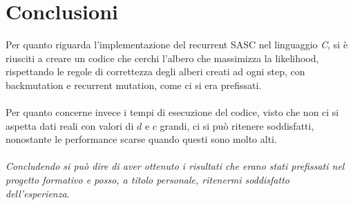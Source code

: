 \documentclass[12pt]{report}
\begin{document}
\chapter{Conclusioni}

Per quanto riguarda l'implementazione del recurrent SASC nel linguaggio \textit{C}, si è riusciti a creare un codice che cerchi l'albero che massimizza la likelihood, rispettando le regole di correttezza degli alberi creati ad ogni step, con backmutation e recurrent mutation, come ci si era prefissati.\\\\
Per quanto concerne invece i tempi di esecuzione del codice, visto che non ci si aspetta dati reali con valori di $d$ e $c$ grandi, ci si può ritenere soddisfatti, nonostante le performance scarse quando questi sono molto alti.\\\\
\textit{Concludendo si può dire di aver ottenuto i risultati che erano stati prefissati nel progetto formativo e posso, a titolo personale, ritenermi soddisfatto dell’esperienza}.

\singlespacing
\newpage
{}
{}
\printbibliography[title={Bibliografia e sitografia}]
\end{document}
